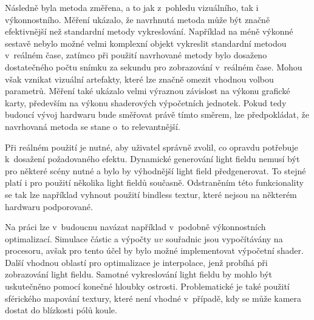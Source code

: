 Následně byla metoda změřena, a to jak z~pohledu vizuálního, tak i výkonnostního. Měření ukázalo, že navrhnutá metoda může být značně efektivnější než standardní metody vykreslování. Například  na méně výkonné sestavě nebylo možné velmi komplexní objekt vykreslit standardní metodou v~reálném čase, zatímco při použití navrhované metody bylo dosaženo dostatečného počtu snímku za sekundu pro zobrazování v~reálném čase. Mohou však vznikat vizuální artefakty, které lze značně omezit vhodnou volbou parametrů. Měření také ukázalo velmi výraznou závislost na výkonu grafické karty, především na výkonu shaderových výpočetních jednotek. Pokud tedy budoucí vývoj hardwaru bude směřovat právě tímto směrem, lze předpokládat, že navrhovaná metoda se stane o~to relevantnější. 

Při reálném použití je nutné, aby uživatel správně zvolil, co opravdu potřebuje k~dosažení požadovaného efektu. Dynamické generování light fieldu nemusí být pro některé scény nutné a bylo by výhodnější light field předgenerovat. To stejné platí i pro použití několika light fieldů současně. Odstraněním této funkcionality se tak lze například vyhnout použití bindless textur, které nejsou na některém hardwaru podporované. 

Na práci lze v~budoucnu navázat například v~podobně výkonnostních  optimalizací. Simulace částic a výpočty $uv$ souřadnic jsou vypočítávány na procesoru, avšak pro tento účel by bylo možné implementovat výpočetní shader. Další vhodnou oblastí pro optimalizace je interpolace, jenž probíhá při zobrazování light fieldu. Samotné vykreslování light fieldu by mohlo být uskutečněno pomocí konečné hloubky ostrosti. Problematické je také použití sférického mapování textury, které není vhodné v~případě, kdy se může kamera dostat do blízkosti pólů koule.  

